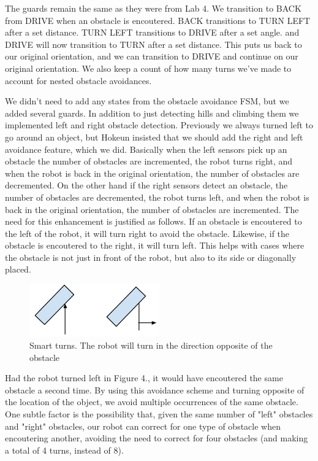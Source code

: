 \documentclass[10pt,titlepage]{article}
\begin{document}
    The guards remain the same as they were from Lab 4. We transition to BACK from DRIVE when an obstacle is encoutered. BACK transitions to TURN LEFT after a set distance. TURN LEFT transitions to DRIVE after a set angle. and DRIVE will now transition to TURN after a set distance. This puts us back to our original orientation, and we can transition to DRIVE and continue on our original orientation. We also keep a count of how many turns we've made to account for nested obstacle avoidances.
    
    
    We didn't need to add any states from the obstacle avoidance FSM, but we added several guards. In addition to just detecting hills and climbing them we implemented left and right obstacle detection. Previously we always turned left to go around an object, but Hokeun insisted that we should add the right and left avoidance feature, which we did. Basically when the left sensors pick up an obstacle the number of obstacles are incremented, the robot turns right, and when the robot is back in the original orientation, the number of obstacles are decremented. On the other hand if the right sensors detect an obstacle, the number of obstacles are decremented, the robot turns left, and when the robot is back in the original orientation, the number of obstacles are incremented. 
    The need for this enhancement is justified as follows. If an obstacle is encoutered to the left of the robot, it will turn right to avoid the obstacle. Likewise, if the obstacle is encoutered to the right, it will turn left. This helps with cases where the obstacle is not just in front of the robot, but also to its side or diagonally placed.
    \begin{figure}[H]
        \includegraphics[keepaspectratio, width=0.5\textwidth]{../lab6_data/d.png}
        \caption{Smart turns. The robot will turn in the direction opposite of the obstacle}
    \end{figure}
    Had the robot turned left in Figure 4., it would have encoutered the same obstacle a second time. By using this avoidance scheme and turning opposite of the location of the object, we avoid multiple occurrences of the same obstacle. One subtle factor is the possibility that, given the same number of "left" obstacles and "right" obstacles, our robot can correct for one type of obstacle when encoutering another, avoiding the need to correct for four obstacles (and making a total of 4 turns, instead of 8).
\end{document}
